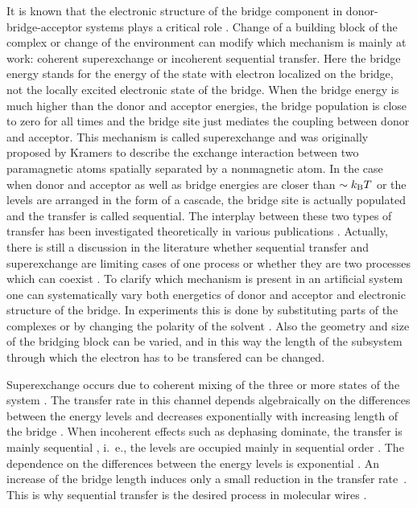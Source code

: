 \documentclass[12pt,twoside,a4paper]{report}
\begin{document}
It is known that the electronic structure of the bridge component in 
donor-bridge-acceptor systems plays a critical role \cite{wasi92,barb96}. 
Change of a building block of the complex \cite{w1,r4,z4} or change of the 
environment \cite{r4,b7} can modify which mechanism  is mainly at work: 
coherent superexchange 
or incoherent sequential transfer. 
Here the bridge energy 
stands for
the energy of the state with electron localized on the bridge, 
not the locally excited electronic state of the bridge.
When the bridge energy 
is much higher than the donor and acceptor energies, the bridge population 
is close to zero for all times and the bridge site just mediates the 
coupling between donor and acceptor. This mechanism is called superexchange 
and was originally proposed by Kramers \cite{kram34} to describe the 
exchange interaction between two paramagnetic atoms spatially separated by a 
nonmagnetic atom. 
In the case
when donor and acceptor as well as 
bridge energies are closer than $\sim k_{{\rm B}}T$
or the levels are arranged in the form of a cascade, 
the bridge site is 
actually populated and the transfer is called sequential. 
The interplay 
between these two types of transfer has been investigated theoretically in 
various publications \cite{sumi96,p3,okad98}. Actually, 
there is still a discussion in the literature whether sequential transfer and 
superexchange are limiting cases of one process \cite{sumi96} or whether 
they are two processes which can coexist \cite{bixo91}. 
To clarify which 
mechanism is 
present
in an artificial system one can systematically vary 
both energetics of donor and acceptor and electronic structure of the bridge.
In experiments this is done by substituting parts 
of the complexes \cite{r4,z4,p2} or by changing the polarity of the 
solvent \cite{r4}. Also the geometry and size of the bridging block can be 
varied, and in this way the length of the subsystem through which the 
electron has to be transfered \cite{p2,h1,l2,m10} can be changed.  
 
Superexchange occurs due to coherent mixing of the three or more states of 
the system \cite{r2,e1}. The transfer rate in this channel depends 
algebraically on the differences between the energy levels \cite{w1,j1} and 
decreases exponentially with increasing length of the bridge \cite{m10,e1}. 
When incoherent effects such as dephasing dominate, the transfer is mainly 
sequential \cite{skou95,m10}, i.~e., the levels are occupied mainly in 
sequential order \cite{b1,skou95,schr98b,r4}. The dependence on the differences 
between the energy levels is exponential \cite{w1,j1}. An increase of the 
bridge length induces only a small reduction in 
the transfer rate~\cite{p3,h1,m10,e1}. 
This is why sequential transfer is the desired process in 
molecular wires \cite{m10,davi98}. 
  
\end{document}
